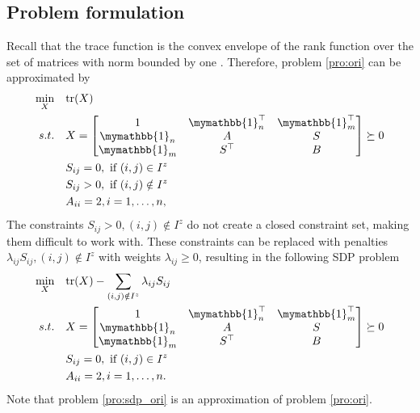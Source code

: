 \documentclass[smallextended, envcountsame]{svjour3}
\begin{document}
\subsection{Problem formulation}
    Recall that the trace function is the convex envelope of the rank function over the set of matrices with norm bounded by one \cite{fazel2002matrix}.  Therefore, problem \eqref{pro:ori} can be approximated by
    \begin{align*}
    \begin{split}
        \min_X~~~&\mathrm{tr}(X)\\
        s.t.~~~& X = 
        \begin{bmatrix}
            1 & \mymathbb{1}_n^\top & \mymathbb{1}_m^\top\\
            \mymathbb{1}_n & A & S\\
            \mymathbb{1}_m & S^\top & B
        \end{bmatrix} \succeq 0\\
        & S_{ij} = 0,~\text{if}~(i,j)\in I^z\\
        & S_{ij} > 0,~\text{if}~(i,j)\notin I^z\\
        & A_{ii} = 2, i = 1,\ldots,n,
    \end{split}
    \end{align*}
    The constraints $S_{ij} > 0,(i,j)\notin I^z$ do not create a closed constraint set, making them difficult to work with.  These constraints can be replaced with penalties $\lambda_{ij}S_{ij},(i,j)\notin I^z$ with weights $\lambda_{ij}\ge 0$, resulting in the following SDP problem
    \begin{align}\label{pro:sdp_ori}
    \begin{split}
        \min_X~~~&\mathrm{tr}(X) - \sum_{(i,j)\notin I^z}\lambda_{ij}S_{ij}\\
        s.t.~~~& X = 
        \begin{bmatrix}
            1 & \mymathbb{1}_n^\top & \mymathbb{1}_m^\top\\
            \mymathbb{1}_n & A & S\\
            \mymathbb{1}_m & S^\top & B
        \end{bmatrix} \succeq 0\\
        & S_{ij} = 0,~\text{if}~(i,j)\in I^z\\
        & A_{ii} = 2, i = 1,\ldots,n.
    \end{split}
    \end{align}
    Note that problem \eqref{pro:sdp_ori} is an approximation of problem \eqref{pro:ori}. 
    
\end{document}
